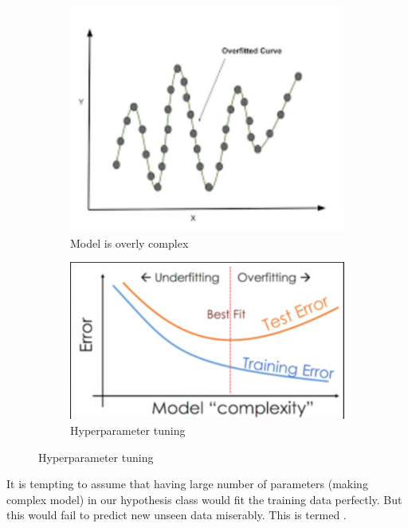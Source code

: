\begin{figure}
  \begin{subfigure}{0.45\textwidth}
    \centering
    \includegraphics[scale=0.4]{images/05.png}
    \caption{Model is overly complex}
  \end{subfigure}
  \begin{subfigure}{0.45\textwidth}
    \centering
    \includegraphics[scale=0.4]{images/06.png}
    \caption{Hyperparameter tuning}
  \end{subfigure}
\end{figure}

It is tempting to assume that having large number of parameters (making complex model) in our hypothesis class would fit the training data perfectly. But this would fail to predict new unseen data miserably. This is termed .

